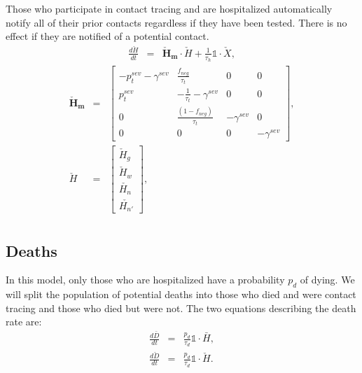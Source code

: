 \documentclass[notitlepage, superscriptaddress]{revtex4-2}
\begin{document}
Those who participate in contact tracing and are hospitalized automatically notify all of their prior contacts regardless if they have been tested. There is no effect if they are notified of a potential contact.
\begin{eqnarray}
\frac{d\check{H}}{dt} &=& \boldsymbol{\check{H}_{m}} \cdot \check{H} + \frac{1}{\tau_{h}} \mathbb{1} \cdot  \check{X}, 
\end{eqnarray}
%
\begin{eqnarray}
\boldsymbol{\check{H}_{m}} &=&
\begin{bmatrix}
 - p^{sev}_{t} - \gamma^{sev} & \frac{f_{neg}}{\tau_{t}}  & 0 & 0 \\
p^{sev}_{t}  & -\frac{1}{\tau_{t}} - \gamma^{sev}      &  0    & 0  \\
 0 & \frac{(1-f_{neg})}{\tau_{t}}  & - \gamma^{sev}  & 0 \\ 
0 & 0 & 0 & - \gamma^{sev}
\end{bmatrix}, \\ 
%
\check{H} &=& 
\begin{bmatrix}
\check{H}_{g} \\  \check{H}_{w}\\ \check{H_{n}} \\ \check{H_{n'}}
\end{bmatrix}, \\ 
%
\end{eqnarray}
% 

\subsection{Deaths}
In this model, only those who are hospitalized have a probability $p_{d}$ of dying. We will split the population of potential deaths into those who died and were contact tracing and those who died but were not. The two equations describing the death rate are:
\begin{eqnarray}
\frac{d\bar{D}}{dt} &=& \frac{p_{d}}{\tau_{d}} \mathbb{1} \cdot \bar{H}, \\ 
\frac{d\check{D}}{dt} &=& \frac{p_{d}}{\tau_{d}} \mathbb{1} \cdot \check{H}.
\end{eqnarray}
\end{document}
